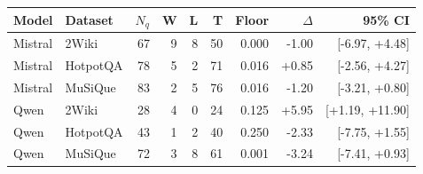 \begin{tabular}{@{}llrrrrrrr@{}}
\toprule
Model & Dataset & $N_q$ & W & L & T & Floor & $\Delta$ & 95\% CI \\
\midrule
Mistral & 2Wiki & 67 & 9 & 8 & 50 & 0.000 & -1.00 & [-6.97, +4.48] \\
Mistral & HotpotQA & 78 & 5 & 2 & 71 & 0.016 & +0.85 & [-2.56, +4.27] \\
Mistral & MuSiQue & 83 & 2 & 5 & 76 & 0.016 & -1.20 & [-3.21, +0.80] \\
Qwen & 2Wiki & 28 & 4 & 0 & 24 & 0.125 & +5.95 & [+1.19, +11.90] \\
Qwen & HotpotQA & 43 & 1 & 2 & 40 & 0.250 & -2.33 & [-7.75, +1.55] \\
Qwen & MuSiQue & 72 & 3 & 8 & 61 & 0.001 & -3.24 & [-7.41, +0.93] \\
\bottomrule
\end{tabular}
